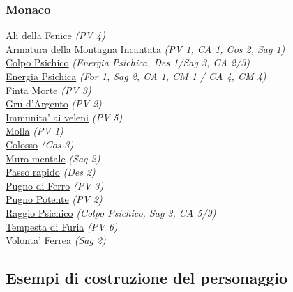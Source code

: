 \begin{multicols}{3}
{\begin{flushleft}
\titlespacing*{\subsubsection}{0pt}{0.5em}{0.5em}\subsubsection*{Monaco}

\hyperlink{Ali della Fenice}{Ali della Fenice} \textit{(PV 4)}\\
\hyperlink{Armatura della Montagna Incantata}{Armatura della Montagna Incantata} \textit{(PV 1, CA 1, Cos 2, Sag 1)}\\
\hyperlink{Colpo Psichico}{Colpo Psichico} \textit{(Energia Psichica, Des 1/Sag 3, CA 2/3)}\\
\hyperlink{Energia Psichica}{Energia Psichica} \textit{(For 1, Sag 2, CA 1, CM 1 / CA 4, CM 4)}\\
\hyperlink{Finta Morte}{Finta Morte} \textit{(PV 3)}\\
\hyperlink{Gru d'Argento}{Gru d'Argento} \textit{(PV 2)}\\
\hyperlink{Immunita' ai veleni}{Immunita' ai veleni} \textit{(PV 5)}\\
\hyperlink{Molla}{Molla} \textit{(PV 1)}\\
\hyperlink{Colosso}{Colosso} \textit{(Cos 3)}\\
\hyperlink{Muro mentale}{Muro mentale} \textit{(Sag 2)}\\
\hyperlink{Passo rapido}{Passo rapido} \textit{(Des 2)}\\
\hyperlink{Pugno di Ferro}{Pugno di Ferro} \textit{(PV 3)}\\
\hyperlink{Pugno Potente}{Pugno Potente} \textit{(PV 2)}\\
\hyperlink{Raggio Psichico}{Raggio Psichico} \textit{(Colpo Psichico, Sag 3, CA 5/9)}\\
\hyperlink{Tempesta di Furia}{Tempesta di Furia} \textit{(PV 6)}\\
\hyperlink{Volonta' Ferrea}{Volonta' Ferrea} \textit{(Sag 2)}\\

\end{flushleft}
}

\end{multicols}



\subsection{Esempi di costruzione del personaggio}

